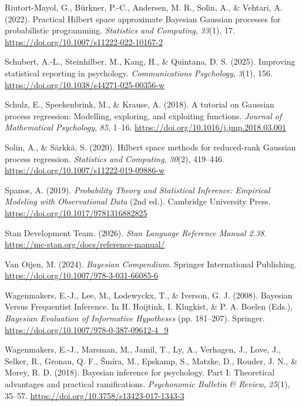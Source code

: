 \documentclass[
  11pt,
  a4paper,
]{report}
\newlength{\cslhangindent}
\newenvironment{CSLReferences}[2] %
 {\begin{list}{}{%
  \setlength{\itemindent}{0pt}
  \setlength{\leftmargin}{0pt}
  \setlength{\parsep}{0pt}
  \ifodd #1
   \setlength{\leftmargin}{\cslhangindent}
   \setlength{\itemindent}{-1\cslhangindent}
  \fi
  \setlength{\itemsep}{#2\baselineskip}}}
 {\end{list}}
\begin{document}
\begin{CSLReferences}{1}{0}
Riutort-Mayol, G., Bürkner, P.-C., Andersen, M. R., Solin, A., \&
Vehtari, A. (2022). Practical {Hilbert} space approximate {Bayesian
Gaussian} processes for probabilistic programming. \emph{Statistics and
Computing}, \emph{33}(1), 17.
\url{https://doi.org/10.1007/s11222-022-10167-2}

Schubert, A.-L., Steinhilber, M., Kang, H., \& Quintana, D. S. (2025).
Improving statistical reporting in psychology. \emph{Communications
Psychology}, \emph{3}(1), 156.
\url{https://doi.org/10.1038/s44271-025-00356-w}

Schulz, E., Speekenbrink, M., \& Krause, A. (2018). A tutorial on
{Gaussian} process regression: {Modelling}, exploring, and exploiting
functions. \emph{Journal of Mathematical Psychology}, \emph{85}, 1--16.
\url{https://doi.org/10.1016/j.jmp.2018.03.001}

Solin, A., \& Särkkä, S. (2020). Hilbert space methods for reduced-rank
{Gaussian} process regression. \emph{Statistics and Computing},
\emph{30}(2), 419--446. \url{https://doi.org/10.1007/s11222-019-09886-w}

Spanos, A. (2019). \emph{Probability {Theory} and {Statistical
Inference}: {Empirical Modeling} with {Observational Data}} (2nd ed.).
Cambridge University Press. \url{https://doi.org/10.1017/9781316882825}

Stan Development Team. (2026). \emph{Stan {Language Reference Manual}
2.38}. \url{https://mc-stan.org/docs/reference-manual/}

Van Oijen, M. (2024). \emph{Bayesian {Compendium}}. Springer
International Publishing.
\url{https://doi.org/10.1007/978-3-031-66085-6}

Wagenmakers, E.-J., Lee, M., Lodewyckx, T., \& Iverson, G. J. (2008).
Bayesian {Versus Frequentist Inference}. In H. Hoijtink, I. Klugkist, \&
P. A. Boelen (Eds.), \emph{Bayesian {Evaluation} of {Informative
Hypotheses}} (pp. 181--207). Springer.
\url{https://doi.org/10.1007/978-0-387-09612-4_9}

Wagenmakers, E.-J., Marsman, M., Jamil, T., Ly, A., Verhagen, J., Love,
J., Selker, R., Gronau, Q. F., Šmíra, M., Epskamp, S., Matzke, D.,
Rouder, J. N., \& Morey, R. D. (2018). Bayesian inference for
psychology. {Part I}: {Theoretical} advantages and practical
ramifications. \emph{Psychonomic Bulletin \& Review}, \emph{25}(1),
35--57. \url{https://doi.org/10.3758/s13423-017-1343-3}


\end{CSLReferences}
\end{document}
